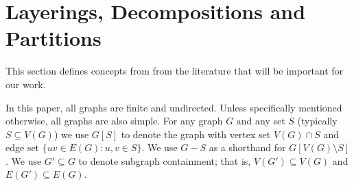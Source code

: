 \documentclass{patmorin}
\newcommand{\note}[2]{{\color{red}[#1:~#2]}}
\begin{document}








\section{Layerings, Decompositions and Partitions}
\label{Tools}

This section defines concepts from from the literature that will be important for our work. 

In this paper, all graphs are finite and undirected. Unless specifically mentioned otherwise, all graphs are also simple. For any graph $G$ and any set $S$ (typically $S\subseteq V(G)$) we use $G[S]$ to denote the graph with vertex set $V(G)\cap S$ and edge set $\{uv\in E(G) : u,v\in S\}$.  We use $G-S$ as a shorthand for $G[V(G)\setminus S]$. We use $G'\subseteq G$ to denote subgraph containment; that is, $V(G')\subseteq V(G)$ and $E(G')\subseteq E(G)$.
\end{document}
